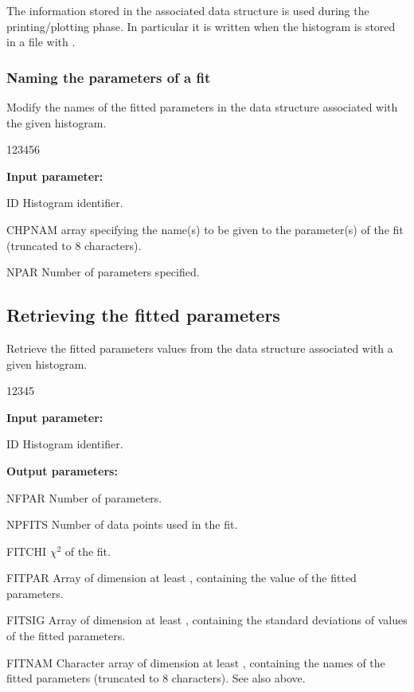 The information stored in the associated data structure is used 
during the printing/plotting phase.
In particular it is written when the histogram is stored in a file
with .

\subsubsection*{Naming the parameters of a fit}

 
\Action
Modify the names of the fitted parameters
in the data structure associated with the given histogram.

\begin{DLtt}{123456}
\item[{\rm\bf Input parameter:}]
\item[ID]     Histogram identifier.
\item[CHPNAM]  array specifying the name(s) to be given to
              the parameter(s) of the fit (truncated to 8 characters).
\item[NPAR]   Number of parameters specified.
\end{DLtt}

\subsection*{Retrieving the fitted parameters}


\Action
Retrieve the fitted parameters values
from the data structure associated with a given histogram.

\begin{DLtt}{12345}
\item[\textrm{\textbf{Input parameter:}}]
\item[ID]     Histogram identifier.
\item[\textrm{\textbf{Output parameters:}}]
\item[NFPAR]  Number of parameters.
\item[NPFITS] Number of data points used in the fit.
\item[FITCHI] \(\chi^2\) of the fit.
\item[FITPAR] Array of dimension at least ,
              containing the value of the fitted parameters.
\item[FITSIG] Array of dimension at least ,
              containing the standard deviations of
              values of the fitted parameters.
\item[FITNAM] Character array of dimension at least ,
              containing the names of the fitted parameters
              (truncated to 8 characters). See also 
              above.
\end{DLtt}

